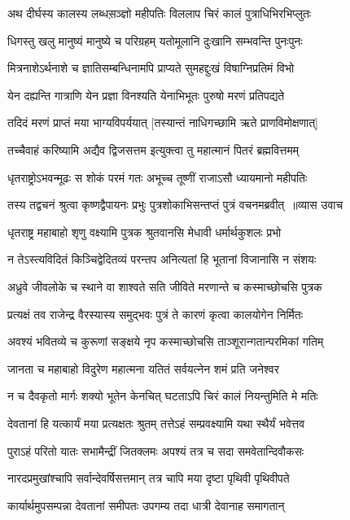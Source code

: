 \twolineshloka
{अथ दीर्घस्य कालस्य लब्धस़ञ्ज्ञो महीपतिः}
{विललाप चिरं कालं पुत्राधिभिरभिप्लुतः}


\twolineshloka
{धिगस्तु खलु मानुष्यं मानुष्ये च परिग्रहम्}
{यतोमूलानि दुःखानि सम्भवन्ति पुनःपुनः}


\twolineshloka
{मित्रनाशेऽर्थनाशे च ज्ञातिसम्बन्धिनामपि}
{प्राप्यते सुमहद्दुःखं विषाग्निप्रतिमं विभो}


\twolineshloka
{येन दह्यन्ति गात्राणि येन प्रज्ञा विनश्यति}
{येनाभिभूतः पुरुषो मरणं प्रतिपद्यते}


\twolineshloka
{तदिदं मरणं प्राप्तं मया भाग्यविपर्ययात्}
{[तस्यान्तं नाधिगच्छामि ऋते प्राणविमोक्षणात्]}


\twolineshloka
{तच्चैवाहं करिष्यामि अद्यैव द्विजसत्तम}
{इत्युक्त्वा तु महात्मानं पितरं ब्रह्मवित्तमम्}


\twolineshloka
{धृतराष्ट्रोऽभवन्मूढः स शोकं परमं गतः}
{अभूच्च तूष्णीं राजाऽसौ ध्यायमानो महीपतिः}


\threelineshloka
{तस्य तद्वचनं श्रुत्वा कृष्णद्वैपायनः प्रभुः}
{पुत्रशोकाभिसन्तप्तं पुत्रं वचनमब्रवीत् ॥व्यास उवाच}
{}


\twolineshloka
{धृतराष्ट्र महाबाहो शृणु वक्ष्यामि पुत्रक}
{श्रुतवानसि मेधावी धर्मार्थकुशलः प्रभो}


\twolineshloka
{न तेऽस्त्यविदितं किञ्चिद्वेदितव्यं परन्तप}
{अनित्यतां हि भूतानां विजानासि न संशयः}


\twolineshloka
{अध्रुवे जीवलोके च स्थाने वा शाश्वते सति}
{जीविते मरणान्ते च कस्माच्छोचसि पुत्रक}


\twolineshloka
{प्रत्यक्षं तव राजेन्द्र वैरस्यास्य समुद्भवः}
{पुत्रं ते कारणं कृत्वा कालयोगेन निर्मितः}


\twolineshloka
{अवश्यं भवितव्ये च कुरूणां सङ्क्षये नृप}
{कस्माच्छोचसि ताञ्शूरान्गतान्परमिकां गतिम्}


\twolineshloka
{जानता च महाबाहो विदुरेण महात्मना}
{यतितं सर्वयत्नेन शमं प्रति जनेश्वर}


\twolineshloka
{न च दैवकृतो मार्गः शक्यो भूतेन केनचित्}
{घटताऽपि चिरं कालं नियन्तुमिति मे मतिः}


\twolineshloka
{देवतानां हि यत्कार्यं मया प्रत्यक्षतः श्रुतम्}
{तत्तेऽहं सम्प्रवक्ष्यामि यथा स्थैर्यं भवेत्तव}


\twolineshloka
{पुराऽहं परितो यातः सभामैन्द्रीं जितक्लमः}
{अपश्यं तत्र च सदा समवेतान्दिवौकसः}


\twolineshloka
{नारदप्रमुखांश्चापि सर्वान्देवर्षिसत्तमान्}
{तत्र चापि मया दृष्टा पृथिवी पृथिवीपते}


\twolineshloka
{कार्यार्थमुपसम्पन्ना देवतानां समीपतः}
{उपगम्य तदा धात्री देवानाह समागतान्}


